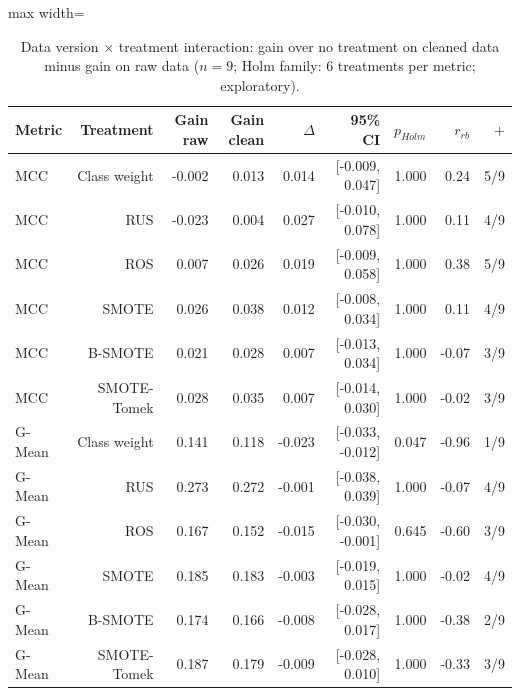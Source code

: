 \begin{table}[t]
\centering
\footnotesize
\caption{Data version $\times$ treatment interaction: gain over no treatment on cleaned data minus gain on raw data ($n=9$; Holm family: 6 treatments per metric; exploratory).}
\label{tab:interact}
\begin{adjustbox}{max width=\linewidth}
\begin{tabular}{lrrrrrrrr}
\toprule
Metric & Treatment & Gain raw & Gain clean & $\Delta$ & 95\% CI & $p_{Holm}$ & $r_{rb}$ & $+$ \\
\midrule
MCC & Class weight & -0.002 & 0.013 & 0.014 & [-0.009, 0.047] & 1.000 & 0.24 & 5/9 \\
MCC & RUS & -0.023 & 0.004 & 0.027 & [-0.010, 0.078] & 1.000 & 0.11 & 4/9 \\
MCC & ROS & 0.007 & 0.026 & 0.019 & [-0.009, 0.058] & 1.000 & 0.38 & 5/9 \\
MCC & SMOTE & 0.026 & 0.038 & 0.012 & [-0.008, 0.034] & 1.000 & 0.11 & 4/9 \\
MCC & B-SMOTE & 0.021 & 0.028 & 0.007 & [-0.013, 0.034] & 1.000 & -0.07 & 3/9 \\
MCC & SMOTE-Tomek & 0.028 & 0.035 & 0.007 & [-0.014, 0.030] & 1.000 & -0.02 & 3/9 \\
G-Mean & Class weight & 0.141 & 0.118 & -0.023 & [-0.033, -0.012] & 0.047 & -0.96 & 1/9 \\
G-Mean & RUS & 0.273 & 0.272 & -0.001 & [-0.038, 0.039] & 1.000 & -0.07 & 4/9 \\
G-Mean & ROS & 0.167 & 0.152 & -0.015 & [-0.030, -0.001] & 0.645 & -0.60 & 3/9 \\
G-Mean & SMOTE & 0.185 & 0.183 & -0.003 & [-0.019, 0.015] & 1.000 & -0.02 & 4/9 \\
G-Mean & B-SMOTE & 0.174 & 0.166 & -0.008 & [-0.028, 0.017] & 1.000 & -0.38 & 2/9 \\
G-Mean & SMOTE-Tomek & 0.187 & 0.179 & -0.009 & [-0.028, 0.010] & 1.000 & -0.33 & 3/9 \\
\bottomrule
\end{tabular}
\end{adjustbox}
\end{table}

